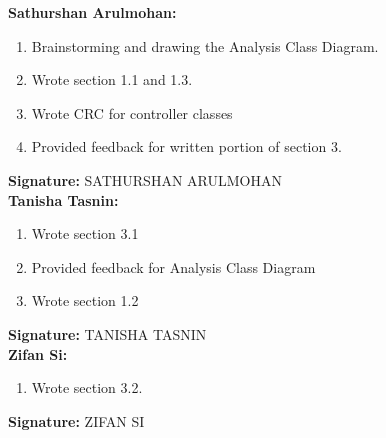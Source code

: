 \documentclass[]{article}
\begin{document}
\textbf{Sathurshan Arulmohan:}
\begin{enumerate}
	\item Brainstorming and drawing the Analysis Class Diagram.
	\item Wrote section 1.1 and 1.3.
	\item Wrote CRC for controller classes
	\item Provided feedback for written portion of section 3.
\end{enumerate}

\textbf{Signature:} SATHURSHAN ARULMOHAN \\

\textbf{Tanisha Tasnin:}
\begin{enumerate}
	\item Wrote section 3.1 
	\item Provided feedback for Analysis Class Diagram
	\item Wrote section 1.2
\end{enumerate}

\textbf{Signature:} TANISHA TASNIN \\

\textbf{Zifan Si:}
\begin{enumerate}
	\item Wrote section 3.2.
\end{enumerate}

\textbf{Signature:} ZIFAN SI  \\
\end{document}
